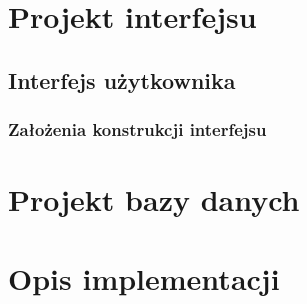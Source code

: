 \section{Projekt interfejsu}

\subsection{Interfejs użytkownika}


\subsubsection{Założenia konstrukcji interfejsu}




\section{Projekt bazy danych}



\section{Opis implementacji}
